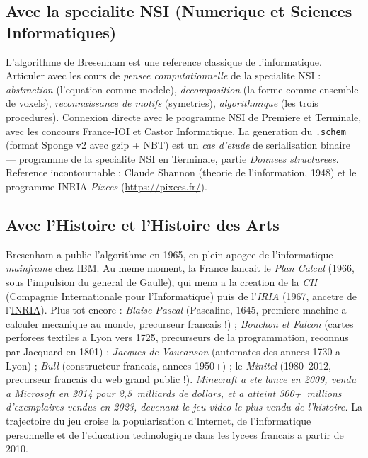 \documentclass[12pt,a4paper]{scrartcl}
\begin{document}
\subsection{Avec la specialite NSI (Numerique et Sciences Informatiques)}
L'algorithme de Bresenham est une reference classique de l'informatique. Articuler avec les cours de \emph{pensee computationnelle} de la specialite NSI : \emph{abstraction} (l'equation comme modele), \emph{decomposition} (la forme comme ensemble de voxels), \emph{reconnaissance de motifs} (symetries), \emph{algorithmique} (les trois procedures). Connexion directe avec le programme NSI de Premiere et Terminale, avec les concours France-IOI et Castor Informatique. La generation du \texttt{.schem} (format Sponge v2 avec gzip + NBT) est un \emph{cas d'etude} de serialisation binaire --- programme de la specialite NSI en Terminale, partie \emph{Donnees structurees}. Reference incontournable : Claude Shannon (theorie de l'information, 1948) et le programme INRIA \emph{Pixees} (\url{https://pixees.fr/}).

\subsection{Avec l'Histoire et l'Histoire des Arts}
Bresenham a publie l'algorithme en 1965, en plein apogee de l'informatique \emph{mainframe} chez IBM. Au meme moment, la France lancait le \emph{Plan Calcul} (1966, sous l'impulsion du general de Gaulle), qui mena a la creation de la \emph{CII} (Compagnie Internationale pour l'Informatique) puis de l'\emph{IRIA} (1967, ancetre de l'\href{https://www.inria.fr/}{INRIA}). Plus tot encore : \emph{Blaise Pascal} (Pascaline, 1645, premiere machine a calculer mecanique au monde, precurseur francais !) ; \emph{Bouchon et Falcon} (cartes perforees textiles a Lyon vers 1725, precurseurs de la programmation, reconnus par Jacquard en 1801) ; \emph{Jacques de Vaucanson} (automates des annees 1730 a Lyon) ; \emph{Bull} (constructeur francais, annees 1950+) ; le \emph{Minitel} (1980--2012, precurseur francais du web grand public !). \emph{Minecraft a ete lance en 2009, vendu a Microsoft en 2014 pour 2,5~milliards de dollars, et a atteint 300+~millions d'exemplaires vendus en 2023, devenant le jeu video le plus vendu de l'histoire.} La trajectoire du jeu croise la popularisation d'Internet, de l'informatique personnelle et de l'education technologique dans les lycees francais a partir de 2010.
\end{document}
